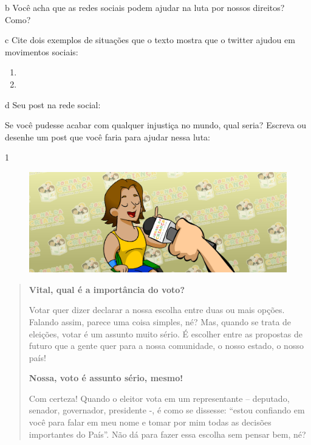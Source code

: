 \num{b} Você acha que as redes sociais podem ajudar na luta por nossos direitos? Como?


\num{c} Cite dois exemplos de situações que o texto mostra que o twitter ajudou
em movimentos sociais:

\begin{enumerate}
\item {} 

\item {} 
\end{enumerate}

\num{d} Seu post na rede social:

Se você pudesse acabar com qualquer injustiça no mundo, qual seria?
Escreva ou desenhe um post que você faria para ajudar nessa luta:




\num{1}

\begin{figure}[htpb!]
\includegraphics[width=.5\textwidth]{./imgs/img51.png}
\end{figure}

\begin{quote}
\textbf{Vital, qual é a importância do voto?}

Votar quer dizer declarar a nossa escolha entre duas ou mais opções.
Falando assim, parece uma coisa simples, né? Mas, quando se trata de
eleições, votar é um assunto muito sério. É escolher entre as propostas
de futuro que a gente quer para a nossa comunidade, o nosso estado, o
nosso país!

\noindent\textbf{Nossa, voto é assunto sério, mesmo!}

Com certeza! Quando o eleitor vota em um representante -- deputado,
senador, governador, presidente -, é como se dissesse: ``estou confiando
em você para falar em meu nome e tomar por mim todas as decisões
importantes do País''. Não dá para fazer essa escolha sem pensar bem,
né?

\end{quote}

